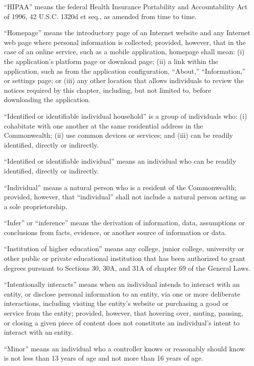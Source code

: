 “HIPAA” means the federal Health Insurance Portability and Accountability Act of 1996, 42 U.S.C. 1320d et seq., as amended from time to time.

“Homepage” means the introductory page of an Internet website and any Internet web page where personal information is collected; provided, however, that in the case of an online service, such as a mobile application, homepage shall mean: (i) the application’s platform page or download page; (ii) a link within the application, such as from the application configuration, “About,” “Information,” or settings page; or (iii) any other location that allows individuals to review the notices required by this chapter, including, but not limited to, before downloading the application.    

“Identified or identifiable individual household” is a group of individuals who: (i) cohabitate with one another at the same residential address in the Commonwealth; (ii) use common devices or services; and (iii) can be readily identified, directly or indirectly.

“Identified or identifiable individual” means an individual who can be readily identified, directly or indirectly.

“Individual” means a natural person who is a resident of the Commonwealth; provided, however, that “individual” shall not include a natural person acting as a sole proprietorship.

“Infer” or “inference” means the derivation of information, data, assumptions or conclusions from facts, evidence, or another source of information or data.

“Institution of higher education” means any college, junior college, university or other public or private educational institution that has been authorized to grant degrees pursuant to Sections 30, 30A, and 31A of chapter 69 of the General Laws.

“Intentionally interacts” means when an individual intends to interact with an entity, or disclose personal information to an entity, via one or more deliberate interactions, including visiting the entity’s website or purchasing a good or service from the entity; provided, however, that hovering over, muting, pausing, or closing a given piece of content does not constitute an individual’s intent to interact with an entity.

“Minor” means an individual who a controller knows or reasonably should know is not less than 13 years of age and not more than 16 years of age.

